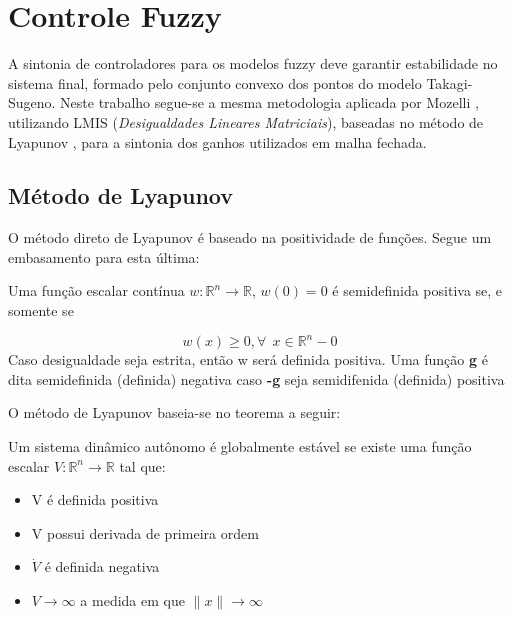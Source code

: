 %

\chapter{Controle Fuzzy} \label{capControle}
A sintonia de controladores para os modelos fuzzy deve garantir estabilidade no sistema final, formado pelo conjunto convexo dos pontos do modelo Takagi-Sugeno. Neste trabalho segue-se a mesma metodologia aplicada por Mozelli \cite{mozelli}, utilizando LMIS (\textit{Desigualdades Lineares Matriciais}), baseadas no método de Lyapunov \cite{lyapunov}, para a sintonia dos ganhos utilizados em malha fechada.

\section{Método de Lyapunov}
O método direto de Lyapunov é baseado na positividade de funções. Segue um embasamento para esta última:

\begin{mydef}
Uma função escalar contínua $w: \mathbb{R}^n \rightarrow \mathbb{R}$, $w(0) = 0$ é semidefinida positiva se, e somente se

	\begin{equation}
		w(x) \geq 0, \forall \ \ x \in \mathbb{R}^n - {0}
	\end{equation}
	Caso desigualdade seja estrita, então w será definida positiva. Uma função \textbf{g} é dita semidefinida (definida) negativa caso \textbf{-g} seja semidifenida (definida) positiva
\end{mydef}

O método de Lyapunov baseia-se no teorema a seguir:

\begin{myteo} \label{teoLyapunov}
	Um sistema dinâmico autônomo é globalmente estável se existe uma função escalar $V : \mathbb{R}^n \rightarrow \mathbb{R} $ tal que:
	
	\begin{itemize}
		\item V é definida positiva
		\item V possui derivada de primeira ordem
		\item $\dot{V}$ é definida negativa
		\item $V \rightarrow \infty$ a medida em que $\|x\| \rightarrow \infty$
	\end{itemize}
\end{myteo}


